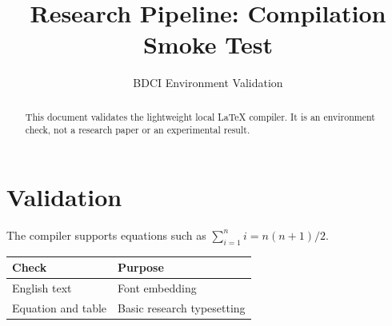 \documentclass{article}
\title{Research Pipeline: Compilation Smoke Test}
\author{BDCI Environment Validation}
\date{}
\begin{document}
\maketitle
\begin{abstract}
This document validates the lightweight local LaTeX compiler. It is an
environment check, not a research paper or an experimental result.
\end{abstract}
\section{Validation}
The compiler supports equations such as $\sum_{i=1}^{n} i = n(n+1)/2$.
\begin{center}
\begin{tabular}{ll}
\toprule
Check & Purpose \\
\midrule
English text & Font embedding \\
Equation and table & Basic research typesetting \\
\bottomrule
\end{tabular}
\end{center}
\end{document}
